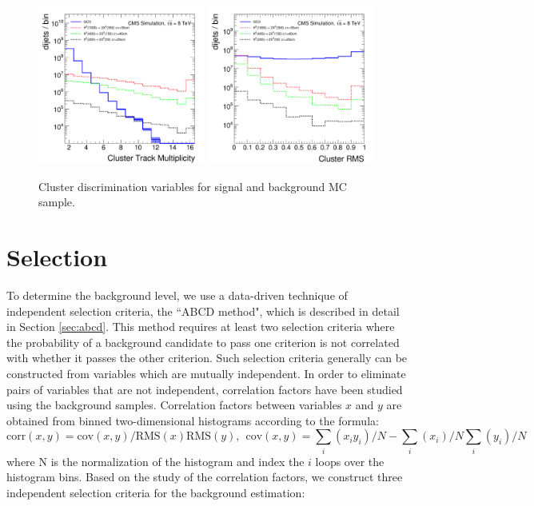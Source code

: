 \begin{enumerate}
\begin{figure}
\centering
\includegraphics[width=0.49\textwidth]{plots/discrimination/disc_clrN.pdf}
\includegraphics[width=0.49\textwidth]{plots/discrimination/disc_clrRMS.pdf}
\caption{Cluster discrimination variables for signal and background MC sample. \label{fig:discclr}}

\end{figure}


\end{enumerate}

\section{Selection}
\label{sec:selection}

To determine the background level, we use a data-driven technique
of independent selection criteria, the ``ABCD method", which is
 described in detail in Section \ref{sec:abcd}. This method requires
at least two selection criteria where the probability of a background candidate to pass one 
criterion is
not correlated with whether it passes the other criterion. Such selection criteria generally can be
constructed
from variables which are mutually independent. 
 In order to eliminate pairs of variables that are not independent,
 correlation factors have been studied using the background samples.  
Correlation factors between variables $x$ and $y$ are obtained from binned two-dimensional histograms 
according to the formula:
\begin{equation}
 \text{corr}(x,y) = \text{cov}(x,y)/\text{RMS}(x)\text{RMS}(y), \hspace{5pt} \text{cov}(x,y)= \sum_i(x_i y_i)/N - \sum_i(x_i)/N \sum_i(y_i)/N
\label{eqn:corr}
\end{equation}
where N is the normalization of the histogram and index the $i$ loops over the histogram bins. Based on the study of the correlation factors, we construct
three independent selection criteria for the background estimation:

